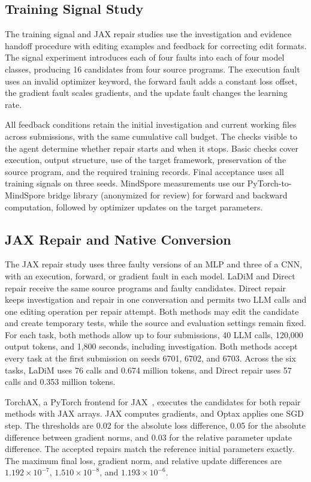 \documentclass{article}
\begin{document}
\subsection{Training Signal Study}
The training signal and JAX repair studies use the investigation and evidence handoff procedure with editing examples and feedback for correcting edit formats. The signal experiment introduces each of four faults into each of four model classes, producing 16 candidates from four source programs. The execution fault uses an invalid optimizer keyword, the forward fault adds a constant loss offset, the gradient fault scales gradients, and the update fault changes the learning rate.

All feedback conditions retain the initial investigation and current working files across submissions, with the same cumulative call budget. The checks visible to the agent determine whether repair starts and when it stops. Basic checks cover execution, output structure, use of the target framework, preservation of the source program, and the required training records. Final acceptance uses all training signals on three seeds. MindSpore measurements use our PyTorch-to-MindSpore bridge library (anonymized for review) for forward and backward computation, followed by optimizer updates on the target parameters.

\subsection{JAX Repair and Native Conversion}
\label{sec:jax-protocol}


The JAX repair study uses three faulty versions of an MLP and three of a CNN, with an execution, forward, or gradient fault in each model. LaDiM and Direct repair receive the same source programs and faulty candidates. Direct repair keeps investigation and repair in one conversation and permits two LLM calls and one editing operation per repair attempt. Both methods may edit the candidate and create temporary tests, while the source and evaluation settings remain fixed. For each task, both methods allow up to four submissions, 40 LLM calls, 120,000 output tokens, and 1,800 seconds, including investigation. Both methods accept every task at the first submission on seeds 6701, 6702, and 6703. Across the six tasks, LaDiM uses 76 calls and 0.674 million tokens, and Direct repair uses 57 calls and 0.353 million tokens.

TorchAX, a PyTorch frontend for JAX~\citep{google2025torchax}, executes the candidates for both repair methods with JAX arrays. JAX computes gradients, and Optax applies one SGD step. The thresholds are 0.02 for the absolute loss difference, 0.05 for the absolute difference between gradient norms, and 0.03 for the relative parameter update difference. The accepted repairs match the reference initial parameters exactly. The maximum final loss, gradient norm, and relative update differences are $1.192\times10^{-7}$, $1.510\times10^{-8}$, and $1.193\times10^{-6}$.
\end{document}
